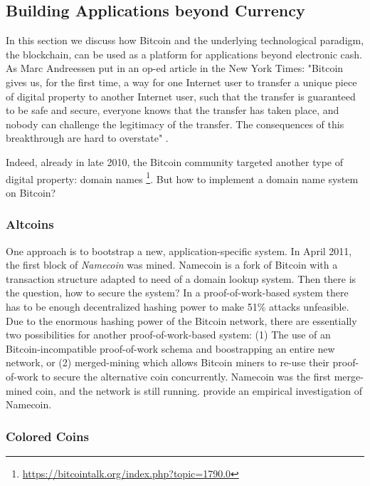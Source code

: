 \subsection{Building Applications beyond Currency}
\label{sec:apps_beyond_currency}

In this section we discuss how Bitcoin and the underlying technological paradigm, the blockchain, can be used as a platform for applications beyond electronic cash. 
As Marc Andreessen put in an op-ed article in the New York Times: "Bitcoin gives us, for the first time, a way for one Internet user to transfer a unique piece of digital property to another Internet user, such that the transfer is guaranteed to be safe and secure, everyone knows that the transfer has taken place, and nobody can challenge the legitimacy of the transfer. The consequences of this breakthrough are hard to overstate" \cite{andreessen2014}.

Indeed, already in late 2010, the Bitcoin community targeted another type of digital property: domain names
\footnote{\url{https://bitcointalk.org/index.php?topic=1790.0}}. But how to implement a domain name system on Bitcoin?

\subsubsection{Altcoins}
One approach is to bootstrap a new, application-specific system. In April 2011, the first block of \emph{Namecoin} was mined. Namecoin is a fork of Bitcoin with a transaction structure adapted to need of a domain lookup system. Then there is the question, how to secure the system? In a proof-of-work-based system there has to be enough decentralized hashing power to make 51\% attacks unfeasible. Due to the enormous hashing power of the Bitcoin network, there are essentially two possibilities for another proof-of-work-based system: (1) The use of an Bitcoin-incompatible proof-of-work schema and boostrapping an entire new network, or (2) merged-mining which allows Bitcoin miners to re-use their proof-of-work to secure the alternative coin concurrently. 
Namecoin was the first merge-mined coin, and the network is still running. \cite{kalodner2015empirical} provide an empirical investigation of Namecoin. 

\subsubsection{Colored Coins}
\label{sec:coloredcoins}

